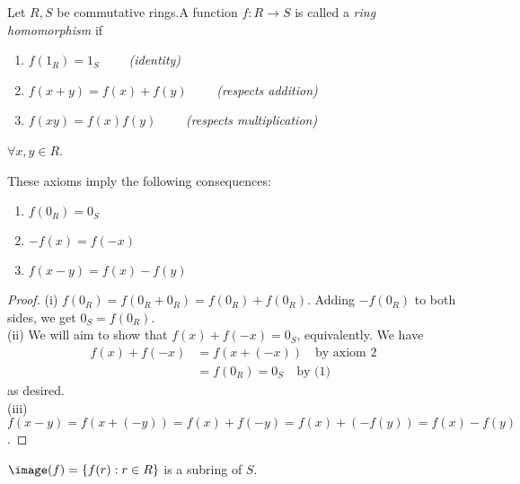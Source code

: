 \documentclass[12pt,oneside]{article}
\begin{document}
\begin{definition}[Homomorphism]
  Let $R, S$ be commutative rings.\footnotemark A function $f : R \to S$ is called a \emph{ring homomorphism} if\footnotemark \begin{enumerate}
    \item $f(1_{R}) = 1_{S} \qquad $ \textit{(identity)}
    \item $f(x+y) = f(x) + f(y) \qquad $ \textit{(respects addition)}
    \item $f(xy) = f(x)f(y) \qquad $ \textit{(respects multiplication)}
  \end{enumerate}
  $\forall x,y \in R$.
\end{definition}
\begin{proposition}
  These axioms imply the following consequences:
  \begin{enumerate}
     \item[(i)] $f(0_{R}) = 0_{S}$
     \item[(ii)] $-f(x) = f(-x)$
     \item[(iii)] $f(x-y) = f(x) - f(y)$
  \end{enumerate}
\end{proposition}
\begin{proof}
  (i) $f(0_R) = f(0_R + 0_R) = f(0_R) + f(0_R)$. Adding $-f(0_R)$ to both sides, we get $0_S = f(0_R)$.\\
  (ii) We will aim to show that $f(x) + f(-x) = 0_S$, equivalently. We have 
  \begin{align*}
    f(x) + f(-x) &= f(x+(-x)) \quad \text{by axiom 2}\\
    &= f(0_R) = 0_S \quad \text{by (1)}
  \end{align*}
  as desired.\\
  (iii) $f(x-y) = f(x + (-y)) = f(x) + f(-y) = f(x) + (-f(y)) = f(x) - f(y)$.
\end{proof}

\begin{proposition}
  $\image(f) = \{f(r) : r \in R\}$ is a subring of $S$.
\end{proposition}
\end{document}
